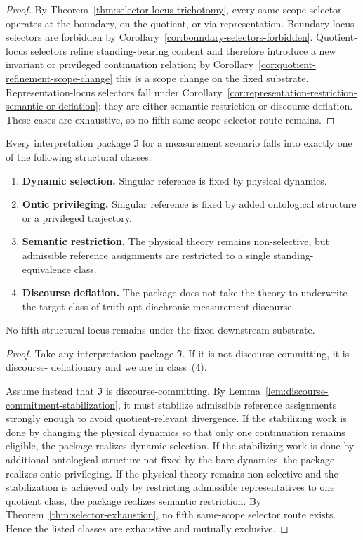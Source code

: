 \begin{proof}
By Theorem~\ref{thm:selector-locus-trichotomy}, every same-scope selector operates at the boundary,
on the quotient, or via representation. Boundary-locus selectors are forbidden by
Corollary~\ref{cor:boundary-selectors-forbidden}. Quotient-locus selectors refine standing-bearing
content and therefore introduce a new invariant or privileged continuation relation; by
Corollary~\ref{cor:quotient-refinement-scope-change} this is a scope change on the fixed substrate.
Representation-locus selectors fall under
Corollary~\ref{cor:representation-restriction-semantic-or-deflation}: they are either semantic
restriction or discourse deflation. These cases are exhaustive, so no fifth same-scope selector route
remains.
\end{proof}

\begin{theorem}
\label{thm:selector-taxonomy}
Every interpretation package $\mathfrak{I}$ for a measurement scenario falls into exactly one of the
following structural classes:
\begin{enumerate}
    \item \textbf{Dynamic selection.} Singular reference is fixed by physical dynamics.
    \item \textbf{Ontic privileging.} Singular reference is fixed by added ontological structure or a
    privileged trajectory.
    \item \textbf{Semantic restriction.} The physical theory remains non-selective, but admissible
    reference assignments are restricted to a single standing-equivalence class.
    \item \textbf{Discourse deflation.} The package does not take the theory to underwrite the target
    class of truth-apt diachronic measurement discourse.
\end{enumerate}
No fifth structural locus remains under the fixed downstream substrate.
\end{theorem}

\begin{proof}
Take any interpretation package $\mathfrak{I}$. If it is not discourse-committing, it is discourse-
deflationary and we are in class~(4).

Assume instead that $\mathfrak{I}$ is discourse-committing. By
Lemma~\ref{lem:discourse-commitment-stabilization}, it must stabilize admissible reference
assignments strongly enough to avoid quotient-relevant divergence. If the stabilizing work is done by
changing the physical dynamics so that only one continuation remains eligible, the package realizes
dynamic selection. If the stabilizing work is done by additional ontological structure not fixed by the
bare dynamics, the package realizes ontic privileging. If the physical theory remains non-selective and
the stabilization is achieved only by restricting admissible representatives to one quotient class, the
package realizes semantic restriction. By Theorem~\ref{thm:selector-exhaustion}, no fifth same-scope
selector route exists. Hence the listed classes are exhaustive and mutually exclusive.
\end{proof}
